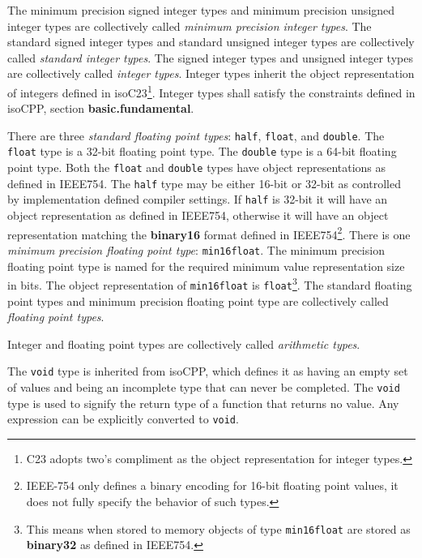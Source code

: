 \p The minimum precision signed integer types and minimum precision unsigned
integer types are collectively called \textit{minimum precision integer types}.
The standard signed integer types and standard unsigned integer types are
collectively called \textit{standard integer types}. The signed integer types
and unsigned integer types are collectively called \textit{integer types}.
Integer types inherit the object representation of integers defined in
\glsdesc{isoC23}\footnote{C23 adopts two's compliment as the object
representation for integer types.}. Integer types shall satisfy the constraints
defined in \glsdesc{isoCPP}, section \textbf{basic.fundamental}.

\p There are three \textit{standard floating point types}: \texttt{half},
\texttt{float}, and \texttt{double}. The \texttt{float} type is a 32-bit
floating point type. The \texttt{double} type is a 64-bit floating point type.
Both the \texttt{float} and \texttt{double} types have object representations as
defined in \gls{IEEE754}. The \texttt{half} type may be either 16-bit or 32-bit
as controlled by implementation defined compiler settings. If \texttt{half} is
32-bit it will have an object representation as defined in \gls{IEEE754},
otherwise it will have an object representation matching the \textbf{binary16}
format defined in \gls{IEEE754}\footnote{IEEE-754 only defines a binary encoding
for 16-bit floating point values, it does not fully specify the behavior of such
types.}. There is one \textit{minimum precision floating point type}:
\texttt{min16float}. The minimum precision floating point type is named for the
required minimum value representation size in bits. The object representation of
\texttt{min16float} is \texttt{float}\footnote{This means when stored to memory
objects of type \texttt{min16float} are stored as \textbf{binary32} as defined
in \gls{IEEE754}.}. The standard floating point types and minimum precision
floating point type are collectively called \textit{floating point types}.

\p Integer and floating point types are collectively called \textit{arithmetic
types}.

\p The \texttt{void} type is inherited from \gls{isoCPP}, which defines it as
having an empty set of values and being an incomplete type that can never be
completed. The \texttt{void} type is used to signify the return type of a
function that returns no value. Any expression can be explicitly converted to
\texttt{void}.


